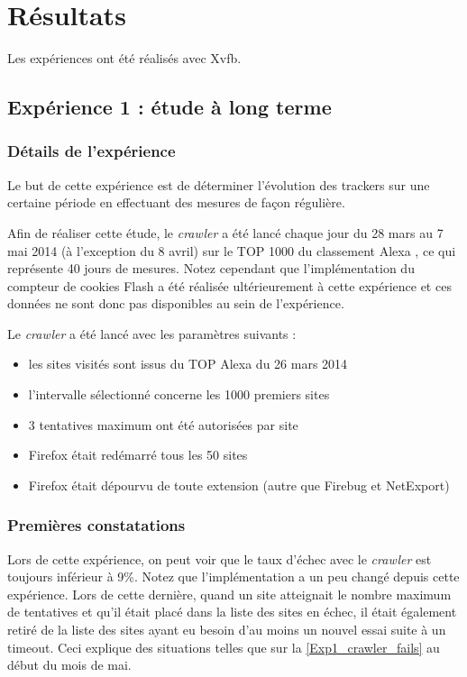 \chapter{Résultats}
Les expériences ont été réalisés avec Xvfb.

\section{Expérience 1 : étude à long terme}
\subsection{Détails de l'expérience}
Le but de cette expérience est de déterminer l'évolution des trackers sur une certaine période en effectuant des mesures de façon régulière.

Afin de réaliser cette étude, le \textit{crawler} a été lancé chaque jour du 28 mars au 7 mai 2014 (à l'exception du 8 avril) sur le TOP 1000 du classement Alexa \cite{AlexaTop}, ce qui représente 40 jours de mesures. Notez cependant que l'implémentation du compteur de cookies Flash a été réalisée ultérieurement à cette expérience et ces données ne sont donc pas disponibles au sein de l'expérience.
\newline

Le \textit{crawler} a été lancé avec les paramètres suivants :
\begin{itemize}
	\item les sites visités sont issus du TOP Alexa du 26 mars 2014
	\item l'intervalle sélectionné concerne les 1000 premiers sites
	\item 3 tentatives maximum ont été autorisées par site
	\item Firefox était redémarré tous les 50 sites
	\item Firefox était dépourvu de toute extension (autre que Firebug et NetExport)
	\newline
\end{itemize}

\subsection{Premières constatations}
Lors de cette expérience, on peut voir que le taux d'échec avec le \textit{crawler} est toujours inférieur à 9\%.
Notez que l'implémentation a un peu changé depuis cette expérience. Lors de cette dernière, quand un site atteignait le nombre maximum de tentatives et qu'il était placé dans la liste des sites en échec, il était également retiré de la liste des sites ayant eu besoin d'au moins un nouvel essai suite à un timeout.
Ceci explique des situations telles que sur la \autoref{Exp1_crawler_fails} au début du mois de mai.

